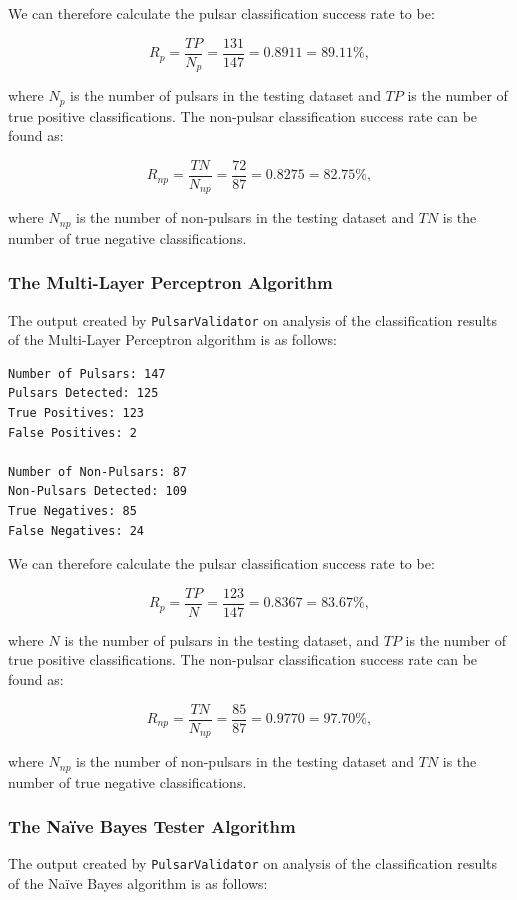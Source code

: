 \documentclass{article}
\begin{document}
We can therefore calculate the pulsar classification success rate to be:

$$ R_{p} = \frac{TP}{N_p} = \frac{131}{147} =  0.8911 = 89.11\%,$$

where $N_p$ is the number of pulsars in the testing dataset and $TP$ is the number of true positive classifications. The non-pulsar classification success rate can be found as:

$$R_{np} = \frac{TN}{N_{np}} = \frac{72}{87} = 0.8275 = 82.75\%,$$

where $N_{np}$ is the number of non-pulsars in the testing dataset and $TN$ is the number of true negative classifications.

\subsubsection{The Multi-Layer Perceptron Algorithm}

The output created by \verb|PulsarValidator| on analysis of the classification results of the Multi-Layer Perceptron algorithm is as follows:

\begin{lstlisting}[numbers=none]
Number of Pulsars: 147
Pulsars Detected: 125
True Positives: 123
False Positives: 2

Number of Non-Pulsars: 87
Non-Pulsars Detected: 109
True Negatives: 85
False Negatives: 24
\end{lstlisting}

We can therefore calculate the pulsar classification success rate to be:

$$ R_{p} = \frac{TP}{N} = \frac{123}{147} =  0.8367 = 83.67\%,$$

where $N$ is the number of pulsars in the testing dataset, and $TP$ is the number of true positive classifications. The non-pulsar classification success rate can be found as:

$$R_{np} = \frac{TN}{N_{np}} = \frac{85}{87} = 0.9770 = 97.70\%,$$

where $N_{np}$ is the number of non-pulsars in the testing dataset and $TN$ is the number of true negative classifications.

\subsubsection{The Naïve Bayes Tester Algorithm}

The output created by \verb|PulsarValidator| on analysis of the classification results of the Naïve Bayes algorithm is as follows:
\end{document}
